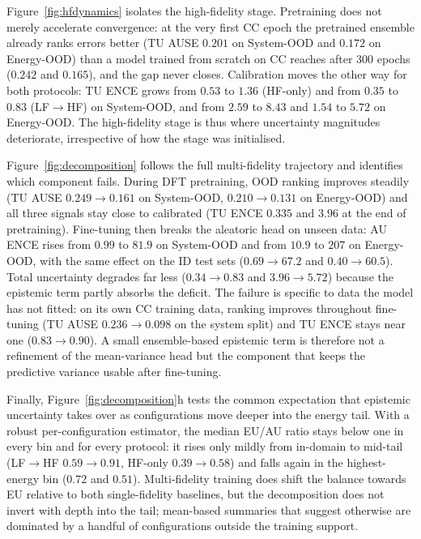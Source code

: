 Figure~\ref{fig:hfdynamics} isolates the high-fidelity stage. Pretraining does not merely
accelerate convergence: at the very first CC epoch the pretrained ensemble already ranks
errors better (TU AUSE $0.201$ on System-OOD and $0.172$ on Energy-OOD) than a model
trained from scratch on CC reaches after 300 epochs ($0.242$ and $0.165$), and the gap
never closes. Calibration moves the other way for both protocols: TU ENCE grows from
$0.53$ to $1.36$ (HF-only) and from $0.35$ to $0.83$ (LF$\rightarrow$HF) on System-OOD,
and from $2.59$ to $8.43$ and $1.54$ to $5.72$ on Energy-OOD. The high-fidelity stage is
thus where uncertainty magnitudes deteriorate, irrespective of how the stage was
initialised.

Figure~\ref{fig:decomposition} follows the full multi-fidelity trajectory and identifies
which component fails. During DFT pretraining, OOD ranking improves steadily (TU AUSE
$0.249\to0.161$ on System-OOD, $0.210\to0.131$ on Energy-OOD) and all three signals stay
close to calibrated (TU ENCE $0.335$ and $3.96$ at the end of pretraining). Fine-tuning
then breaks the aleatoric head on unseen data: AU ENCE rises from $0.99$ to $81.9$ on
System-OOD and from $10.9$ to $207$ on Energy-OOD, with the same effect on the ID test
sets ($0.69\to67.2$ and $0.40\to60.5$). Total uncertainty degrades far less
($0.34\to0.83$ and $3.96\to5.72$) because the epistemic term partly absorbs the
deficit. The failure is specific to data the model has not fitted: on its own CC training
data, ranking improves throughout fine-tuning (TU AUSE $0.236\to0.098$ on the system
split) and TU ENCE stays near one ($0.83\to0.90$). A small ensemble-based epistemic term
is therefore not a refinement of the mean-variance head but the component that keeps the
predictive variance usable after fine-tuning.

Finally, Figure~\ref{fig:decomposition}h tests the common expectation that epistemic
uncertainty takes over as configurations move deeper into the energy tail. With a robust
per-configuration estimator, the median EU/AU ratio stays below one in every bin and for
every protocol: it rises only mildly from in-domain to mid-tail (LF$\rightarrow$HF
$0.59\to0.91$, HF-only $0.39\to0.58$) and falls again in the highest-energy bin
($0.72$ and $0.51$). Multi-fidelity training does shift the balance towards EU relative
to both single-fidelity baselines, but the decomposition does not invert with depth into
the tail; mean-based summaries that suggest otherwise are dominated by a handful of
configurations outside the training support.

